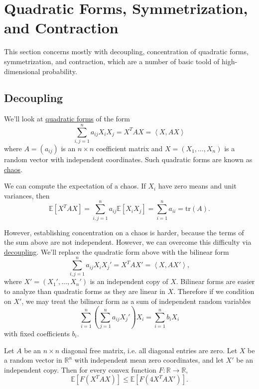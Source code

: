 \section{Quadratic Forms, Symmetrization, and Contraction}
This section concerns mostly with decoupling, concentration of quadratic forms, symmetrization, and contraction, 
which are a number of basic toold of high-dimensional probability.



\subsection{Decoupling}
We'll look at \underline{quadratic forms} of the form
\[ \sum_{i, j = 1}^{n} a_{ij} X_i X_j = X^T AX = \left\langle X, AX \right\rangle \]
where $A = (a_{ij})$ is an $n \times n$ coefficient matrix and $X = (X_1, \dots, X_n)$ is a random vector 
with independent coordinates. Such quadratic forms are known as \underline{chaos}.

We can compute the expectation of a chaos. If $X_i$ have zero means and unit variances, then 
\[ \mathbb{E}[X^T AX] = \sum_{i, j = 1}^{n} a_{ij} \mathbb{E}[X_i X_j] 
= \sum_{i = 1}^{n} a_{ii} = \mathrm{tr}(A). \]

However, establishing concentration on a chaos is harder, because the terms of the sum above are not 
independent. However, we can overcome this difficulty via \underline{decoupling}. We'll replace the quadratic 
form above with the bilinear form 
\[ \sum_{i, j = 1}^{n} a_{ij}  X_iX_j' = X^T AX' = \left\langle X, AX' \right\rangle,  \]
where $X' = (X_1', \dots, X_n')$ is an independent copy of $X$. Bilinear forms are easier to analyze than 
quadratic forms as they are linear in $X$. Therefore if we condition on $X'$, we may treat the bilinear form 
as a sum of independent random variables
\[ \sum_{i = 1}^{n} \left( \sum_{j = 1}^{n} a_{ij} X_j' \right) X_i = \sum_{i = 1}^{n} b_i X_i \]
with fixed coefficients $b_i$.

\begin{theorem}[Decoupling]
Let $A$ be an $n \times n$ diagonal free matrix, i.e. all diagonal entries are zero. Let $X$ be a random vector 
in $\mathbb{R}^n$ with independent mean zero coordinates, and let $X'$ be an independent copy. Then for every 
convex function $F: \mathbb{R} \to \mathbb{R}$, 
\[ \mathbb{E}[F(X^T AX)] \leq \mathbb{E}[F(4X^T AX')]. \]
\end{theorem}

